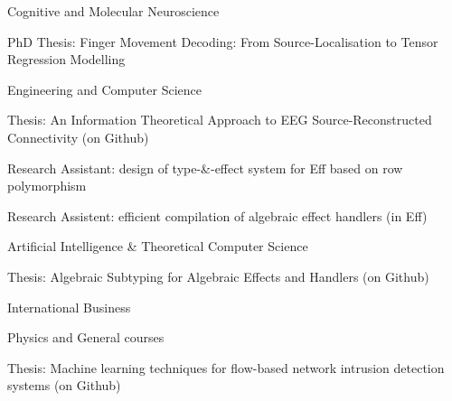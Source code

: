 
\begin{cventries}
{\begin{cvitems}\item Cognitive and Molecular Neuroscience
\item PhD Thesis: Finger Movement Decoding: From Source-Localisation to Tensor Regression Modelling
\end{cvitems}
}

{\begin{cvitems}\item Engineering and Computer Science
\item Thesis: An Information Theoretical Approach to EEG Source-Reconstructed Connectivity (on Github)
\end{cvitems}
}

{\begin{cvitems}\item Research Assistant: design of type-\&-effect system for Eff  based on row polymorphism
\item Research Assistent: efficient compilation of algebraic effect handlers (in Eff)
\end{cvitems}
}

{\begin{cvitems}\item Artificial Intelligence \& Theoretical Computer Science
\item Thesis: Algebraic Subtyping for Algebraic Effects and Handlers (on Github)
\end{cvitems}
}

{\begin{cvitems}\item International Business
\end{cvitems}
}

{\begin{cvitems}\item Physics and General courses
\item Thesis: Machine learning techniques for flow-based network intrusion detection systems (on Github)
\end{cvitems}
}


\end{cventries}
